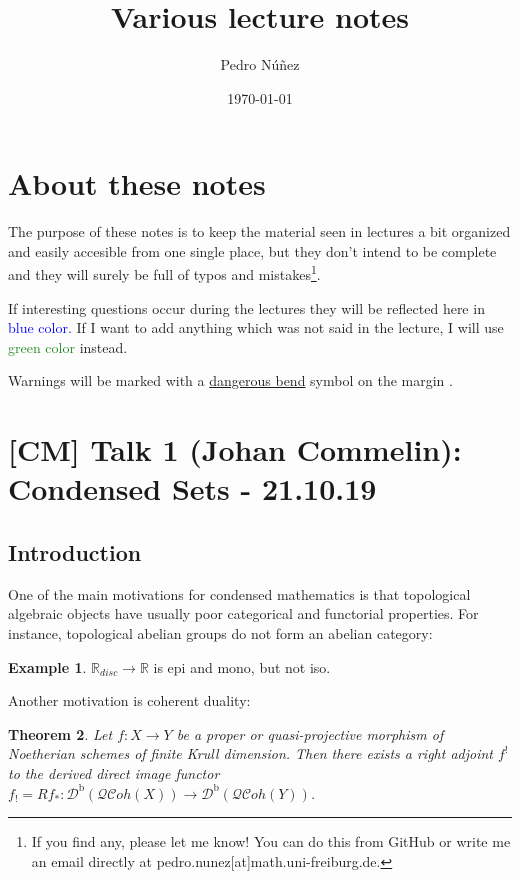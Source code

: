 \documentclass[11pt,A4]{article}
\title{Various lecture notes}
\author{Pedro Núñez}
\date{\today}
\theoremstyle{plain}
\newtheorem{thm}{Theorem}[section]
\theoremstyle{definition}
\newtheorem{exa}[thm]{Example}
\theoremstyle{remark}
\newcommand{\R}{\mathbb{R}}
\newcommand{\1}{\mathbbm{1}}
\newcommand{\Db}{\mathscr{D}^{\mathrm{b}}}
\newcommand{\QCoh}{\mathscr{QC}oh}
\newcommand{\db}{\marginnote{\dbend}}
\begin{document}
\maketitle

\tableofcontents

\section{About these notes}

The purpose of these notes is to keep the material seen in lectures a bit organized and easily accesible from one single place, but they don't intend to be complete and they will surely be full of typos and mistakes\footnote{If you find any, please let me know! You can do this from GitHub or write me an email directly at pedro.nunez[at]math.uni-freiburg.de.}.

If interesting questions occur during the lectures they will be reflected here in \textcolor{blue}{blue color}.
If I want to add anything which was not said in the lecture, I will use \textcolor{ForestGreen}{green color} instead.

Warnings will be marked with a \href{https://en.wikipedia.org/wiki/Bourbaki_dangerous_bend_symbol}{dangerous bend} symbol on the margin \db.

\section{[CM] Talk 1 (Johan Commelin): Condensed Sets - 21.10.19}

\subsection{Introduction}

One of the main motivations for condensed mathematics is that topological algebraic objects have usually poor categorical and functorial properties.
For instance, topological abelian groups do not form an abelian category:

\begin{exa}
    $\R_{disc}\to \R$ is epi and mono, but not iso.
\end{exa}

Another motivation is coherent duality:

\begin{thm}
    Let $f\colon X\to Y$ be a proper or quasi-projective morphism of Noetherian schemes of finite Krull dimension. Then there exists a right adjoint $f^{!}$ to the derived direct image functor $f_{!}=Rf_{*}\colon \Db(\QCoh(X))\to \Db(\QCoh(Y))$.
\end{thm}
\end{document}
